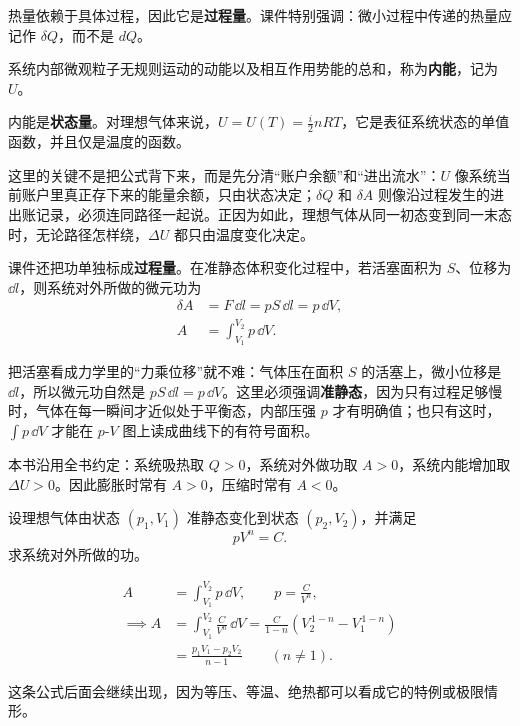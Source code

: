 \documentclass[lang=cn,11pt]{elegantbook}
\newcommand{\bridge}[1]{\begin{note}#1\end{note}}
\begin{document}
热量依赖于具体过程，因此它是\textbf{过程量}。课件特别强调：微小过程中传递的热量应记作 \(\delta Q\)，而不是 \(dQ\)。

\begin{definition}[内能]\label{def:internal-energy}
系统内部微观粒子无规则运动的动能以及相互作用势能的总和，称为\textbf{内能}，记为 \(U\)。
\end{definition}

内能是\textbf{状态量}。对理想气体来说，\(U=U(T)=\frac{i}{2}nRT\)，它是表征系统状态的单值函数，并且仅是温度的函数。

\begin{note}
这里的关键不是把公式背下来，而是先分清“账户余额”和“进出流水”：\(U\) 像系统当前账户里真正存下来的能量余额，只由状态决定；\(\delta Q\) 和 \(\delta A\) 则像沿过程发生的进出账记录，必须连同路径一起说。正因为如此，理想气体从同一初态变到同一末态时，无论路径怎样绕，\(\Delta U\) 都只由温度变化决定。
\end{note}

课件还把功单独标成\textbf{过程量}。在准静态体积变化过程中，若活塞面积为 \(S\)、位移为 \(\dd l\)，则系统对外所做的微元功为
\[
\begin{aligned}
\delta A&=F\,\dd l=pS\,\dd l=p\,\dd V,\\
A&=\int_{V_1}^{V_2}p\,\dd V.
\end{aligned}
\]

\bridge{把活塞看成力学里的“力乘位移”就不难：气体压在面积 \(S\) 的活塞上，微小位移是 \(\dd l\)，所以微元功自然是 \(pS\,\dd l=p\,\dd V\)。这里必须强调\textbf{准静态}，因为只有过程足够慢时，气体在每一瞬间才近似处于平衡态，内部压强 \(p\) 才有明确值；也只有这时，\(\int p\,\dd V\) 才能在 \(p\)-\(V\) 图上读成曲线下的有符号面积。}

\begin{remark}
本书沿用全书约定：系统吸热取 \(Q>0\)，系统对外做功取 \(A>0\)，系统内能增加取 \(\Delta U>0\)。因此膨胀时常有 \(A>0\)，压缩时常有 \(A<0\)。
\end{remark}

\begin{example}[多方关系下的准静态体积功]
设理想气体由状态 \((p_1,V_1)\) 准静态变化到状态 \((p_2,V_2)\)，并满足
\[
pV^n=C.
\]
求系统对外所做的功。
\end{example}

\begin{solution}
\[
\begin{aligned}
A&=\int_{V_1}^{V_2}p\,\dd V,\qquad p=\frac{C}{V^n},\\
\implies A&=\int_{V_1}^{V_2}\frac{C}{V^n}\,\dd V
=\frac{C}{1-n}\left(V_2^{\,1-n}-V_1^{\,1-n}\right)\\
&=\frac{p_1V_1-p_2V_2}{n-1}\qquad (n\neq1).
\end{aligned}
\]

这条公式后面会继续出现，因为等压、等温、绝热都可以看成它的特例或极限情形。
\end{solution}
\end{document}
